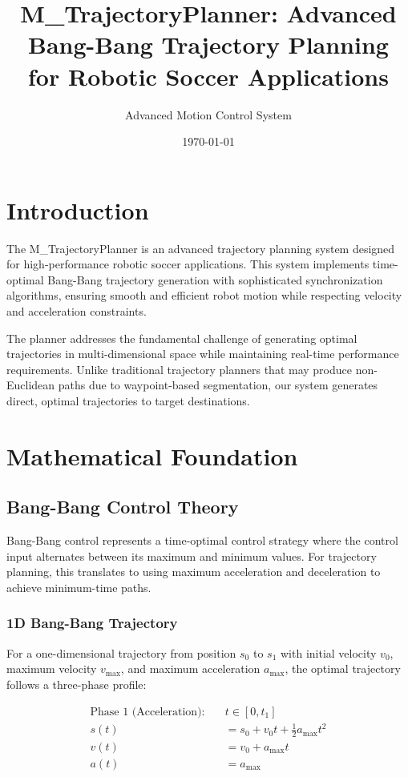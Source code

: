 \documentclass[12pt,a4paper]{article}
\title{M\_TrajectoryPlanner: Advanced Bang-Bang Trajectory Planning\\
for Robotic Soccer Applications}
\author{Advanced Motion Control System}
\date{\today}
\begin{document}
\maketitle

\tableofcontents
\newpage

\section{Introduction}

The M\_TrajectoryPlanner is an advanced trajectory planning system designed for high-performance robotic soccer applications. This system implements time-optimal Bang-Bang trajectory generation with sophisticated synchronization algorithms, ensuring smooth and efficient robot motion while respecting velocity and acceleration constraints.

The planner addresses the fundamental challenge of generating optimal trajectories in multi-dimensional space while maintaining real-time performance requirements. Unlike traditional trajectory planners that may produce non-Euclidean paths due to waypoint-based segmentation, our system generates direct, optimal trajectories to target destinations.

\section{Mathematical Foundation}

\subsection{Bang-Bang Control Theory}

Bang-Bang control represents a time-optimal control strategy where the control input alternates between its maximum and minimum values. For trajectory planning, this translates to using maximum acceleration and deceleration to achieve minimum-time paths.

\subsubsection{1D Bang-Bang Trajectory}

For a one-dimensional trajectory from position $s_0$ to $s_1$ with initial velocity $v_0$, maximum velocity $v_{\max}$, and maximum acceleration $a_{\max}$, the optimal trajectory follows a three-phase profile:

\begin{align}
\text{Phase 1 (Acceleration):} \quad &t \in [0, t_1] \\
s(t) &= s_0 + v_0 t + \frac{1}{2}a_{\max}t^2 \\
v(t) &= v_0 + a_{\max}t \\
a(t) &= a_{\max}
\end{align}
\end{document}
